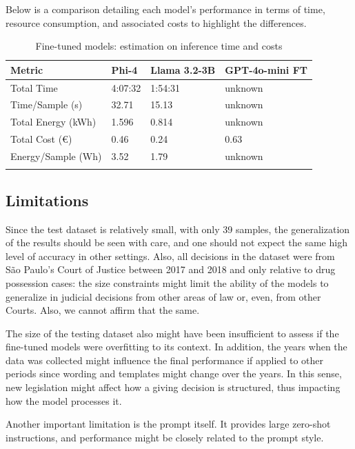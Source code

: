 \documentclass[
  12pt,
]{article}
\begin{document}
Below is a comparison detailing each model's performance in terms of
time, resource consumption, and associated costs to highlight the
differences.

\begin{longtable}[]{@{}llll@{}}

\toprule\noalign{}
Metric & Phi-4 & Llama 3.2-3B & GPT-4o-mini FT \\
\midrule\noalign{}
\endhead
\bottomrule\noalign{}
\endlastfoot
Total Time & 4:07:32 & 1:54:31 & unknown \\
Time/Sample (s) & 32.71 & 15.13 & unknown \\
Total Energy (kWh) & 1.596 & 0.814 & unknown \\
Total Cost (€) & 0.46 & 0.24 & 0.63 \\
Energy/Sample (Wh) & 3.52 & 1.79 & unknown \\


\caption{\label{tbl-inference-costs}Fine-tuned models: estimation on
inference time and costs}

\tabularnewline
\end{longtable}

\subsection{Limitations}\label{sec-limitations}

Since the test dataset is relatively small, with only 39 samples, the
generalization of the results should be seen with care, and one should
not expect the same high level of accuracy in other settings. Also, all
decisions in the dataset were from São Paulo's Court of Justice between
2017 and 2018 and only relative to drug possession cases: the size
constraints might limit the ability of the models to generalize in
judicial decisions from other areas of law or, even, from other Courts.
Also, we cannot affirm that the same.

The size of the testing dataset also might have been insufficient to
assess if the fine-tuned models were overfitting to its context. In
addition, the years when the data was collected might influence the
final performance if applied to other periods since wording and
templates might change over the years. In this sense, new legislation
might affect how a giving decision is structured, thus impacting how the
model processes it.

Another important limitation is the prompt itself. It provides large
zero-shot instructions, and performance might be closely related to the
prompt style.
\end{document}

